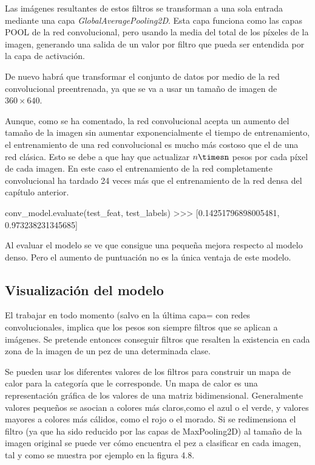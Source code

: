 Las imágenes resultantes de estos filtros se transforman a una sola entrada mediante una capa \textit{GlobalAveragePooling2D}. Esta capa funciona como las capas POOL de la red convolucional, pero usando la media del total de los píxeles de la imagen, generando una salida de un valor por filtro que pueda ser entendida por la capa de activación.

De nuevo habrá que transformar el conjunto de datos por medio de la red convolucional preentrenada, ya que se va a usar un tamaño de imagen de $360\times640$.

Aunque, como se ha comentado, la red convolucional acepta un aumento del tamaño de la imagen sin aumentar exponencialmente el tiempo de entrenamiento, el entrenamiento de una red convolucional es mucho más costoso que el de una red clásica. Esto se debe a que hay que actualizar $n\timesn$ pesos por cada píxel de cada imagen. En este caso el entrenamiento de la red completamente convolucional ha tardado 24 veces más que el entrenamiento de la red densa del capítulo anterior.

\begin{python}
conv_model.evaluate(test_feat, test_labels)
>>> [0.14251796898005481, 0.973238231345685]
\end{python}

Al evaluar el modelo se ve que consigue una pequeña mejora respecto al modelo denso. Pero el aumento de puntuación no es la única ventaja de este modelo.

\subsection{Visualización del modelo}

El trabajar en todo momento (salvo en la última capa= con redes convolucionales, implica que los pesos son siempre filtros que se aplican a imágenes. Se pretende entonces conseguir filtros que resalten la existencia en cada zona de la imagen de un pez de una determinada clase.

Se pueden usar los diferentes valores de los filtros para construir un mapa de calor para la categoría que le corresponde. Un mapa de calor es una representación gráfica de los valores de una matriz bidimensional. Generalmente valores pequeños se asocian a colores más claros,como el azul o el verde, y valores mayores a colores más cálidos, como el rojo o el morado.  Si se redimensiona el filtro (ya que ha sido reducido por las capas de MaxPooling2D) al tamaño de la imagen original se puede ver cómo encuentra el pez a clasificar en cada imagen, tal y como se muestra por ejemplo en la figura 4.8.

